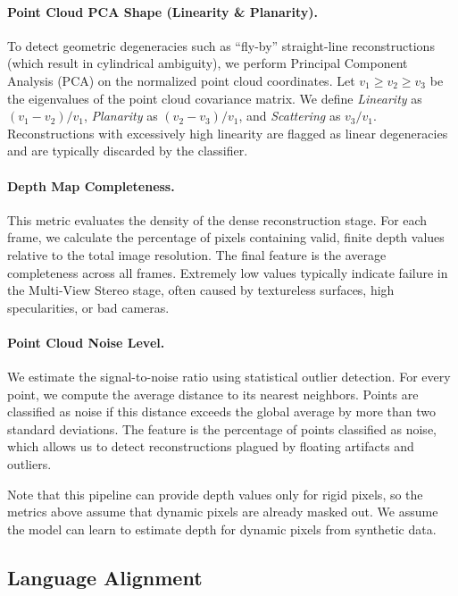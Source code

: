 \paragraph{Point Cloud PCA Shape (Linearity \& Planarity).}

To detect geometric degeneracies such as ``fly-by'' straight-line reconstructions (which result in cylindrical ambiguity), we perform Principal Component Analysis (PCA) on the normalized point cloud coordinates.
Let $v_1 \ge v_2 \ge v_3$ be the eigenvalues of the point cloud covariance matrix.
We define \emph{Linearity} as $(v_1 - v_2) / v_1$, \emph{Planarity} as $(v_2 - v_3) / v_1$, and \emph{Scattering} as $v_3 / v_1$.
Reconstructions with excessively high linearity are flagged as linear degeneracies and are typically discarded by the classifier.

\paragraph{Depth Map Completeness.}

This metric evaluates the density of the dense reconstruction stage.
For each frame, we calculate the percentage of pixels containing valid, finite depth values relative to the total image resolution.
The final feature is the average completeness across all frames.
Extremely low values typically indicate failure in the Multi-View Stereo stage, often caused by textureless surfaces, high specularities, or bad cameras.

\paragraph{Point Cloud Noise Level.}

We estimate the signal-to-noise ratio using statistical outlier detection.
For every point, we compute the average distance to its nearest neighbors.
Points are classified as noise if this distance exceeds the global average by more than two standard deviations.
The feature is the percentage of points classified as noise, which allows us to detect reconstructions plagued by floating artifacts and outliers.

Note that this pipeline can provide depth values only for rigid pixels, so the metrics above assume that dynamic pixels are already masked out.
We assume the model can learn to estimate depth for dynamic pixels from synthetic data.

\subsection{Language Alignment}%
\label{sec:impl-language-alignment}

